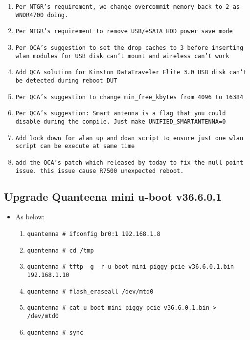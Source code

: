 \documentclass[12pt]{report}
\begin{document}
\begin{itemize}
\begin{enumerate}
		\item \texttt{Per NTGR's requirement, we change overcommit\_memory back to 2 as WNDR4700 doing.}
		\item \texttt{Per NTGR's requirement to remove USB/eSATA HDD power save mode}
		\item \texttt{Per QCA's suggestion to set the drop\_caches to 3 before inserting wlan modules for USB disk can't mount and wireless can't work}
		\item \texttt{Add QCA solution for Kinston DataTraveler Elite 3.0 USB disk can't be detected during reboot DUT}
		\item \texttt{Per QCA's suggestion to change min\_free\_kbytes from 4096 to 16384}
		\item \texttt{Per QCA's suggestion: Smart antenna is a flag that you could disable during the compile. Just make UNIFIED\_SMARTANTENNA=0}
		\item \texttt{Add lock down for wlan up and down script to ensure just one wlan script can be execute at same time}
		\item \texttt{add the QCA's patch which released by today to fix the null point issue. this issue cause R7500 unexpected reboot.}
    	\end{enumerate}
    \end{itemize}

    \subsection{Upgrade Quanteena mini u-boot v36.6.0.1}
    \begin{itemize}
    \item As below:
    	\begin{enumerate}
		\item \texttt{quantenna \# ifconfig br0:1 192.168.1.8}
		\item \texttt{quantenna \# cd /tmp}
		\item \texttt{quantenna \# tftp -g -r u-boot-mini-piggy-pcie-v36.6.0.1.bin 192.168.1.10}
		\item \texttt{quantenna \# flash\_eraseall /dev/mtd0}
		\item \texttt{quantenna \# cat u-boot-mini-piggy-pcie-v36.6.0.1.bin > /dev/mtd0}
		\item \texttt{quantenna \# sync}
    	\end{enumerate}
    \end{itemize}
\end{document}
